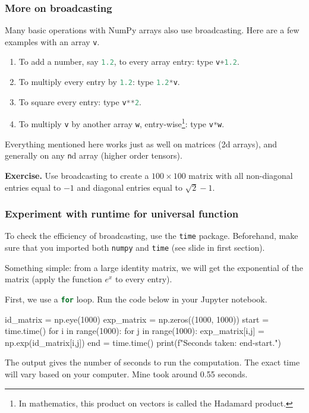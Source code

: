 \documentclass{beamer}
\newenvironment{codeblock}
    {\hfill\begin{beamerboxesrounded}[lower=codecol, width=0.8\textwidth]
    \medskip

    }
    { 
    \end{beamerboxesrounded}\hfill
    }
\theoremstyle{example}
\newcommand{\ct}[1]{\lstinline[language=Python,basicstyle=\ttfamily\footnotesize,stringstyle=\small\color{strings}]!#1!}
\newcommand{\ttt}[1]{{\small\texttt{#1}}}
\begin{document}
\begin{frame}
\frametitle{More on broadcasting}
Many basic operations with NumPy arrays also use broadcasting. Here are a few examples with an array \ct{v}.
\begin{enumerate}
    \item To add a number, say \ct{1.2}, to every array entry: type \ct{v+1.2}.
    \item To multiply every entry by \ct{1.2}: type \ct{1.2*v}.
    \pause
    \item To square every entry: type \ct{v**2}.
    \item To multiply \ct{v} by another array \ct{w}, entry-wise\footnote{In mathematics, this product on vectors is called the Hadamard product.}: type \ct{v*w}.
\end{enumerate}

\pause
Everything mentioned here works just as well on matrices (2d arrays), and generally on any \ttt{n}d array (higher order tensors).

\pause
\vspace*{-6pt}
\textbf{Exercise.} Use broadcasting to create a $100\times 100$ matrix with all non-diagonal entries equal to $-1$ and diagonal entries equal to $\sqrt{2} - 1$.
\end{frame}

\begin{frame}[fragile]
\frametitle{Experiment with runtime for universal function}
To check the efficiency of broadcasting, use the \ct{time} package. Beforehand, make sure that you imported both \ct{numpy} and \ct{time} (see slide in first section).

\pause
Something simple: from a large identity matrix, we will get the exponential of the matrix (apply the function $e^x$ to every entry).

\pause
First, we use a \ct{for} loop. Run the code below in your Jupyter notebook.

\begin{codeblock}

\begin{python}
id_matrix = np.eye(1000)
exp_matrix = np.zeros((1000, 1000))
start = time.time()
for i in range(1000):
    for j in range(1000):
        exp_matrix[i,j] = np.exp(id_matrix[i,j])
end = time.time()
print(f"Seconds taken: {end-start}.")
\end{python}

\end{codeblock}

\pause
The output gives the number of seconds to run the computation. The exact time will vary based on your computer. Mine took around 0.55 seconds.
\end{frame}
\end{document}
